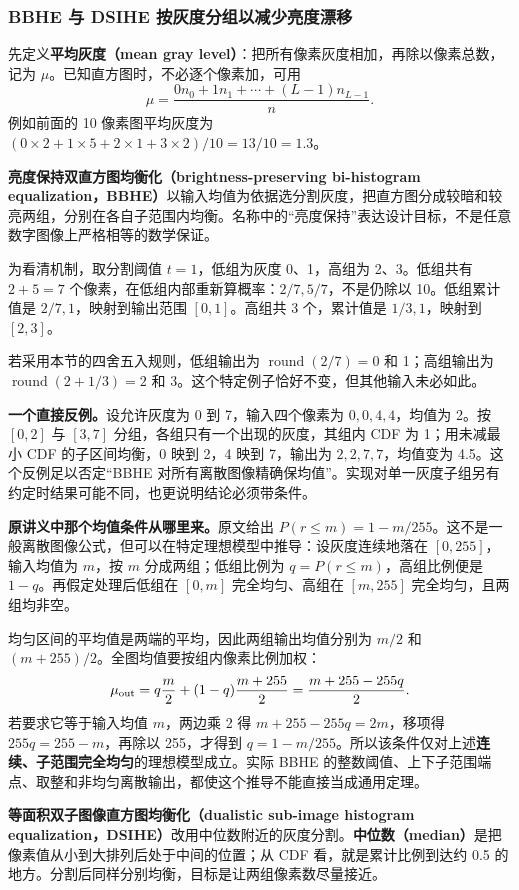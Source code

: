 \subsubsection*{BBHE 与 DSIHE 按灰度分组以减少亮度漂移}

先定义\textbf{平均灰度（mean gray level）}：把所有像素灰度相加，再除以像素总数，记为 $\mu$。已知直方图时，不必逐个像素加，可用
\[
\mu=\frac{0n_0+1n_1+\cdots+(L-1)n_{L-1}}{n}.
\]
例如前面的 10 像素图平均灰度为 $(0\times2+1\times5+2\times1+3\times2)/10=13/10=1.3$。

\textbf{亮度保持双直方图均衡化（brightness-preserving bi-histogram equalization，BBHE）}以输入均值为依据选分割灰度，把直方图分成较暗和较亮两组，分别在各自子范围内均衡。名称中的“亮度保持”表达设计目标，不是任意数字图像上严格相等的数学保证。

为看清机制，取分割阈值 $t=1$，低组为灰度 0、1，高组为 2、3。低组共有 $2+5=7$ 个像素，在低组内部重新算概率：$2/7,5/7$，不是仍除以 10。低组累计值是 $2/7,1$，映射到输出范围 $[0,1]$。高组共 3 个，累计值是 $1/3,1$，映射到 $[2,3]$。

若采用本节的四舍五入规则，低组输出为 $\operatorname{round}(2/7)=0$ 和 1；高组输出为 $\operatorname{round}(2+1/3)=2$ 和 3。这个特定例子恰好不变，但其他输入未必如此。

\textbf{一个直接反例。}设允许灰度为 0 到 7，输入四个像素为 $0,0,4,4$，均值为 2。按 $[0,2]$ 与 $[3,7]$ 分组，各组只有一个出现的灰度，其组内 CDF 为 1；用未减最小 CDF 的子区间均衡，0 映到 2，4 映到 7，输出为 $2,2,7,7$，均值变为 4.5。这个反例足以否定“BBHE 对所有离散图像精确保均值”。实现对单一灰度子组另有约定时结果可能不同，也更说明结论必须带条件。

\textbf{原讲义中那个均值条件从哪里来。}原文给出 $P(r\le m)=1-m/255$。这不是一般离散图像公式，但可以在特定理想模型中推导：设灰度连续地落在 $[0,255]$，输入均值为 $m$，按 $m$ 分成两组；低组比例为 $q=P(r\le m)$，高组比例便是 $1-q$。再假定处理后低组在 $[0,m]$ 完全均匀、高组在 $[m,255]$ 完全均匀，且两组均非空。

均匀区间的平均值是两端的平均，因此两组输出均值分别为 $m/2$ 和 $(m+255)/2$。全图均值要按组内像素比例加权：
\[
\mu_{\rm out}
=q\frac m2+(1-q)\frac{m+255}{2}
=\frac{m+255-255q}{2}.
\]
若要求它等于输入均值 $m$，两边乘 2 得 $m+255-255q=2m$，移项得 $255q=255-m$，再除以 255，才得到 $q=1-m/255$。所以该条件仅对上述\textbf{连续、子范围完全均匀}的理想模型成立。实际 BBHE 的整数阈值、上下子范围端点、取整和非均匀离散输出，都使这个推导不能直接当成通用定理。

\textbf{等面积双子图像直方图均衡化（dualistic sub-image histogram equalization，DSIHE）}改用中位数附近的灰度分割。\textbf{中位数（median）}是把像素值从小到大排列后处于中间的位置；从 CDF 看，就是累计比例到达约 0.5 的地方。分割后同样分别均衡，目标是让两组像素数尽量接近。

